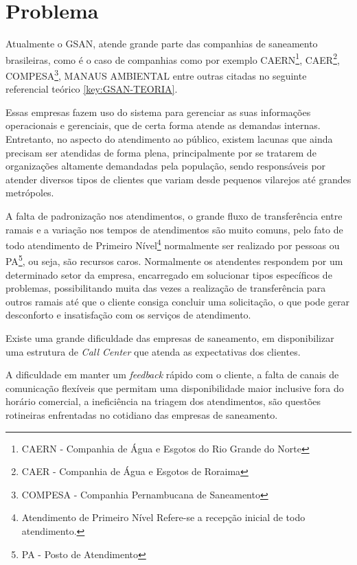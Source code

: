 \section*{Problema}

Atualmente o GSAN, atende grande parte das companhias de saneamento brasileiras, como é o caso de companhias como por exemplo CAERN\footnote{CAERN - Companhia de Água e Esgotos do Rio Grande do Norte}, CAER\footnote{CAER - Companhia de Água e Esgotos de Roraima}, COMPESA\footnote{COMPESA - Companhia Pernambucana de Saneamento}, MANAUS AMBIENTAL entre outras citadas no seguinte referencial teórico \ref{key:GSAN-TEORIA}.

Essas empresas fazem uso do sistema para gerenciar as suas informações operacionais e gerenciais, que de certa forma atende as demandas internas. Entretanto, no aspecto do atendimento ao público, existem lacunas que ainda precisam ser atendidas de forma plena, principalmente por se tratarem de organizações altamente demandadas pela população, sendo responsáveis por atender diversos tipos de clientes que variam desde pequenos vilarejos até grandes metrópoles.

A falta de padronização nos atendimentos, o grande fluxo de transferência entre ramais e a variação nos tempos de atendimentos são muito comuns, pelo fato de todo atendimento de Primeiro Nível\footnote{Atendimento de Primeiro Nível Refere-se a recepção inicial de todo atendimento.} normalmente ser realizado por pessoas ou PA\footnote{PA - Posto de Atendimento}, ou seja, são recursos caros. Normalmente os atendentes respondem por um determinado setor da empresa, encarregado em solucionar tipos específicos de problemas, possibilitando muita das vezes a realização de transferência para outros ramais até que o cliente consiga concluir uma solicitação, o que pode gerar desconforto e insatisfação com os serviços de atendimento.
	
Existe uma grande dificuldade das empresas de saneamento, em disponibilizar uma estrutura de \textit{Call Center} que atenda as expectativas dos clientes.

A dificuldade em manter um \textit{feedback} rápido com o cliente, a falta de canais de comunicação flexíveis que permitam uma disponibilidade maior inclusive fora do horário comercial, a ineficiência na triagem dos atendimentos, são questões rotineiras enfrentadas no cotidiano das empresas de saneamento.
